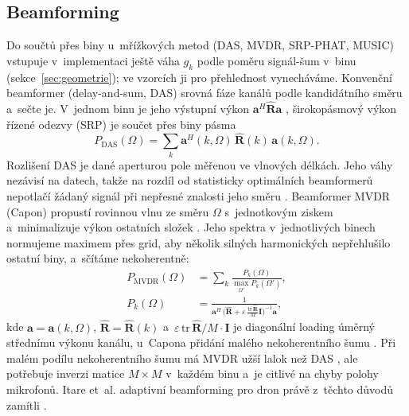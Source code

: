 \documentclass[conference]{IEEEtran}
\begin{document}
\subsection{Beamforming}
Do součtů přes biny u~mřížkových metod (DAS, MVDR, SRP-PHAT, MUSIC) vstupuje v~implementaci ještě váha $g_k$ podle poměru signál-šum v~binu (sekce~\ref{sec:geometrie}); ve vzorcích ji pro přehlednost vynecháváme. Konvenční beamformer (delay-and-sum, DAS) srovná fáze kanálů podle kandidátního směru a~sečte je. V~jednom binu je jeho výstupní výkon $\mathbf{a}^H\hat{\mathbf{R}}\mathbf{a}$ \cite{vanveen1988beamforming}, širokopásmový výkon řízené odezvy (SRP) je součet přes biny pásma
\begin{equation}
  P_{\mathrm{DAS}}(\Omega) = \sum_k \mathbf{a}^H(k,\Omega)\,\hat{\mathbf{R}}(k)\,\mathbf{a}(k,\Omega).
  \label{eq:das}
\end{equation}
Rozlišení DAS je dané aperturou pole měřenou ve vlnových délkách. Jeho váhy nezávisí na datech, takže na rozdíl od statisticky optimálních beamformerů nepotlačí žádaný signál při nepřesné znalosti jeho směru \cite{vanveen1988beamforming}. Beamformer MVDR (Capon) propustí rovinnou vlnu ze směru $\Omega$ s~jednotkovým ziskem a~minimalizuje výkon ostatních složek \cite{capon1969mvdr}. Jeho spektra v~jednotlivých binech normujeme maximem přes grid, aby několik silných harmonických nepřehlušilo ostatní biny, a~sčítáme nekoherentně:
\begin{equation}
  \begin{split}
    P_{\mathrm{MVDR}}(\Omega) &= \sum_k \frac{P_k(\Omega)}{\max_{\Omega'} P_k(\Omega')}, \\
    P_k(\Omega) &= \frac{1}{\mathbf{a}^H\,\big(\hat{\mathbf{R}}+\varepsilon\,\frac{\mathrm{tr}\,\hat{\mathbf{R}}}{M}\mathbf{I}\big)^{-1}\mathbf{a}},
  \end{split}
  \label{eq:mvdr}
\end{equation}
kde $\mathbf{a}=\mathbf{a}(k,\Omega)$, $\hat{\mathbf{R}}=\hat{\mathbf{R}}(k)$ a~$\varepsilon\,\mathrm{tr}\,\hat{\mathbf{R}}/M\cdot\mathbf{I}$ je diagonální loading úměrný střednímu výkonu kanálu, u~Capona přidání malého nekoherentního šumu \cite{capon1969mvdr}. Při malém podílu nekoherentního šumu má MVDR užší lalok než DAS \cite{capon1969mvdr}, ale potřebuje inverzi matice $M\times M$ v~každém binu a~je citlivé na chyby polohy mikrofonů. Itare et~al. adaptivní beamforming pro dron právě z~těchto důvodů zamítli \cite{itare2022frequency}.
\end{document}
